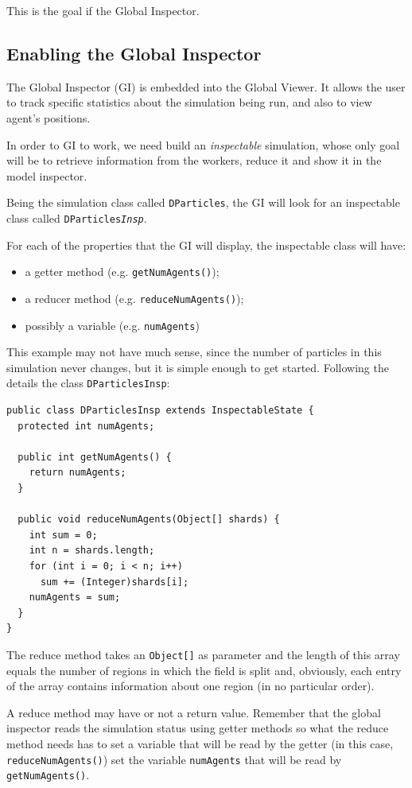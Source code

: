 \documentclass{article}
\begin{document}
This is the goal if the Global Inspector.

\subsection{Enabling the Global Inspector}
The Global Inspector (GI) is embedded into the Global Viewer. It allows the user to track specific statistics about the simulation being run, and also to view agent's positions.

In order to GI to work, we need build an \emph{inspectable} simulation, whose only goal will be to retrieve information from the workers, reduce it and show it in the model inspector.

Being the simulation class called \texttt{DParticles}, the GI will look for an inspectable class called  \texttt{DParticles\emph{Insp}}.

For each of the properties that the GI will display, the inspectable class will have:

\begin{itemize}
	\item a getter method (e.g. \texttt{getNumAgents()});  
  \item a reducer method (e.g. \texttt{reduceNumAgents()});
  \item possibly a variable (e.g. \texttt{numAgents})
\end{itemize}

This example may not have much sense, since the number of particles in this simulation never changes, but it is simple enough to get started. Following the details the class \texttt{DParticlesInsp}:

\begin{lstlisting}
public class DParticlesInsp extends InspectableState {
  protected int numAgents;

  public int getNumAgents() {
    return numAgents;
  }

  public void reduceNumAgents(Object[] shards) {
    int sum = 0;
    int n = shards.length;
    for (int i = 0; i < n; i++)
      sum += (Integer)shards[i];
    numAgents = sum;
  }
}
\end{lstlisting}

The reduce method takes an \texttt{Object[]} as parameter and the length of this array equals the number of regions in which the field is split and, obviously, each entry of the array contains information about one region (in no particular order).

A reduce method may have or not a return value. Remember that the global inspector reads the simulation status using getter methods so what the reduce method needs has to set a variable that will be read by the getter (in this case, \texttt{reduceNumAgents()}) set the variable \texttt{numAgents} that will be read by \texttt{getNumAgents()}.
\end{document}
